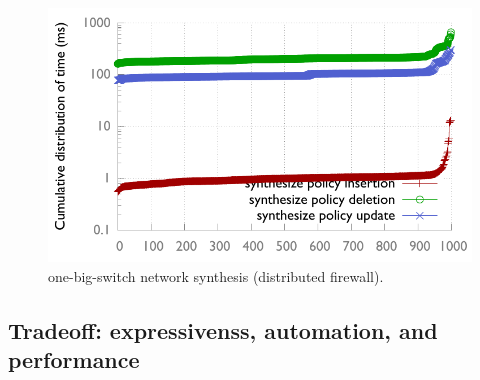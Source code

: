 \begin{figure}
  \centering
  \includegraphics[width=1\linewidth]{figures/obs_synthesis_cdf1000.pdf}
  \caption{one-big-switch network synthesis (distributed firewall).}
  \label{fig:init}
\end{figure}

\subsection{Tradeoff: expressivenss, automation, and performance}


% 

